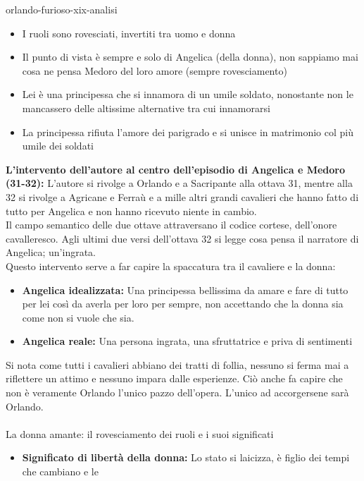 \documentclass[preview]{standalone}
\begin{document}
\begin{snippet}{orlando-furioso-xix-analisi}
    \begin{itemize}
        \item I ruoli sono rovesciati, invertiti tra uomo e donna
        \item Il punto di vista è sempre e solo di Angelica (della donna), non sappiamo mai cosa ne pensa Medoro del loro amore (sempre rovesciamento)
        \item Lei è una principessa che si innamora di un umile soldato, nonostante non le mancassero delle altissime alternative tra cui innamorarsi
        \item La principessa rifiuta l'amore dei parigrado e si unisce in matrimonio col più umile dei soldati
    \end{itemize}

    \textbf{L'intervento dell'autore al centro dell'episodio di Angelica e Medoro (31-32):}
    L'autore si rivolge a Orlando e a Sacripante alla ottava 31, mentre alla 32 si rivolge a Agricane e
    Ferraù e a mille altri grandi cavalieri che hanno fatto di tutto per Angelica e non hanno ricevuto
    niente in cambio. \\
    Il campo semantico delle due ottave attraversano il codice cortese, dell'onore cavalleresco.
    Agli ultimi due versi dell'ottava 32 si legge cosa pensa il narratore di Angelica; un'ingrata.
    \\
    Questo intervento serve a far capire la spaccatura tra il cavaliere e la donna:
    \begin{itemize}
        \item \textbf{Angelica idealizzata:} Una principessa bellissima da amare e fare di tutto per lei così da
        averla per loro per sempre, non accettando che la donna sia come non si vuole che sia.
        \item \textbf{Angelica reale:} Una persona ingrata, una sfruttatrice e priva di sentimenti
    \end{itemize}
    Si nota come tutti i cavalieri abbiano dei tratti di follia, nessuno si ferma mai a riflettere un
    attimo e nessuno impara dalle esperienze. Ciò anche fa capire che non è veramente Orlando
    l'unico pazzo dell'opera. L'unico ad accorgersene sarà Orlando.
    \\\\
    La donna amante: il rovesciamento dei ruoli e i suoi significati
    \begin{itemize}
        \item \textbf{Significato di libertà della donna:} Lo stato si laicizza, è figlio dei tempi che cambiano e le

\end{itemize}
\end{snippet}
\end{document}
